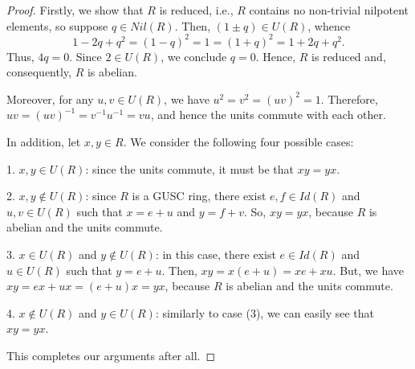 \documentclass[10pt,a4paper]{amsart}
\begin{document}
\begin{proof}
Firstly, we show that \( R \) is reduced, i.e., \( R \) contains no non-trivial nilpotent elements, so suppose \( q \in Nil(R) \). Then, \( (1 \pm q) \in U(R) \), whence
\[ 1 - 2q + q^2 = (1-q)^2 = 1 = (1+q)^2 = 1 + 2q + q^2. \]
Thus, \( 4q = 0 \). Since \( 2 \in U(R) \), we conclude \( q = 0 \). Hence, \( R \) is reduced and, consequently, \( R \) is abelian.
	
Moreover, for any \( u, v \in U(R) \), we have \( u^2 = v^2 = (uv)^2 = 1 \). Therefore, \( uv = (uv)^{-1} = v^{-1} u^{-1} = vu \), and hence the units commute with each other.
	
In addition, let \( x, y \in R \). We consider the following four possible cases:
	
1. \( x, y \in U(R) \): since the units commute, it must be that \( xy = yx \).
	
2. \( x, y \notin U(R) \): since \( R \) is a GUSC ring, there exist \( e, f \in Id(R) \) and $u, v\in U(R)$ such that \( x = e+u \) and \( y = f+v \). So, \( xy = yx \), because \( R \) is abelian and the units commute.
	
3. \( x \in U(R) \) and \( y \notin U(R) \): in this case, there exist \( e \in Id(R) \) and $u\in U(R)$ such that \( y = e+u \). Then, $xy=x(e+u)=xe+xu$. But, we have $xy=ex+ux=(e+u)x=yx$, because $R$ is abelian and the units commute.
	
4. \( x \notin U(R) \) and \( y \in U(R) \): similarly to case (3), we can easily see that \( xy = yx \).	

This completes our arguments after all.
\end{proof}
\end{document}
